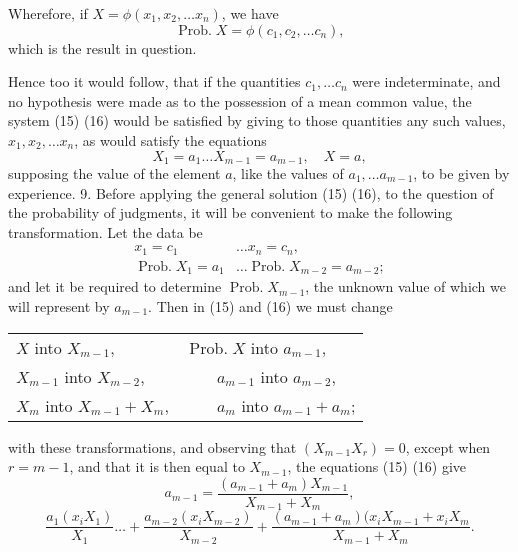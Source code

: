 \documentclass[oneside]{book}
\begin{document}
Wherefore, if $X = \phi(x_1, x_2,\dotsc x_n)$, we have
\begin{equation*}
\operatorname{Prob. } X = \phi(c_1, c_2, \dotsc c_n),
\end{equation*}
which is the result in question.

Hence too it would follow, that if the quantities $c_1,\dotsc c_n$
were indeterminate, and no hypothesis were made as to the
possession of a mean common value, the system (15) (16) would
be satisfied by giving to those quantities any such values,
$x_1, x_2, \dotsc x_n$, as would satisfy the equations
\begin{equation*}
X_1 = a_1 \dotsc X_{m-1} = a_{m-1}, \quad X=a,
\end{equation*}
supposing the value of the element $a$, like the values of
$a_1, \dotsc a_{m-1}$,
to be given by experience.
9. Before applying the general solution (15) (16), to the
question of the probability of judgments, it will be convenient to
make the following transformation. Let the data be
\begin{align*}
x_1 = c_1 & \dots x_n=c_n, \\
\operatorname{Prob. } X_1 = a_1 & \dots
\operatorname{Prob. } X_{m-2} = a_{m-2};
\end{align*}
and let it be required to determine $\operatorname{Prob. } X_{m-1}$, the unknown
value of which we will represent by $a_{m-1}$. Then in (15) and (16)
we must change \\
\begin{center}
\begin{tabular}{ll}
$X$ into $X_{m-1}$, & $\operatorname{Prob. } X$ into $a_{m-1}$, \\
$X_{m-1}$ into $X_{m-2}$, & $\quad \quad a_{m-1}$ into $a_{m-2}$, \\
$X_m$ into $X_{m-1} + X_m$, & $\quad \quad a_m$ into $a_{m-1} + a_m$;
\end{tabular}\end{center}
with these transformations, and observing that $(X_{m-1} X_r)=0$,
except when $r = m-1$, and that it is then equal to $X_{m-1}$, the
equations (15) (16) give
\begin{equation}\tag{19}
a_{m-1}=\frac{(a_{m-1} + a_m)X_{m-1}}{X_{m-1}+X_m},
\end{equation}
\begin{equation}\tag{20}
  \frac{a_1(x_i X_1)}{X_1} \dotsc
+ \frac{a_{m-2}(x_i X_{m-2})}{X_{m-2}}
+ \frac{(a_{m-1} + a_m)(x_i X_{m-1} + x_i X_m}{X_{m-1} + X_m}.
\end{equation}
\end{document}
